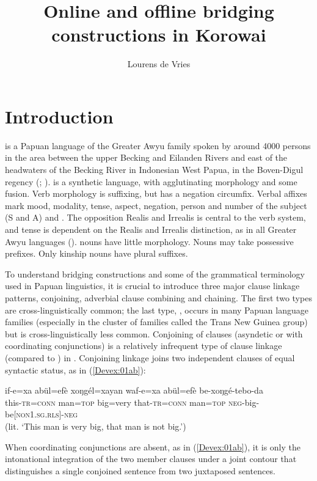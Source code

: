 \documentclass[output=paper]{LSP/langsci}
\author{
   Lourens de Vries\affiliation{Vrije Universiteit Amsterdam} 
   }
\title{Online and offline bridging constructions in Korowai}
\begin{document}
\section{Introduction} 
\label{Devsec:Introduction}
 is a Papuan language of the Greater Awyu family spoken by around 4000 persons in the area between the upper Becking and Eilanden Rivers and east of the headwaters of the Becking River in Indonesian West Papua, in the Boven-Digul regency (\citealt{enk97}; \citealt{devries.2012}).  is a synthetic language, with agglutinating morphology and some fusion. Verb morphology is suffixing, but  has a negation circumfix. Verbal affixes mark mood, modality, tense, aspect, negation, person and number of the subject (S and A) and . The opposition Realis and Irrealis is central to the verb system, and tense is dependent on the Realis and Irrealis distinction, as in all Greater Awyu languages (\citealt{wester14}).  nouns have little morphology. Nouns may take possessive prefixes. Only kinship nouns have plural suffixes.

To understand  bridging constructions and some of the grammatical terminology used in Papuan linguistics, it is crucial to introduce three major  clause linkage patterns, conjoining, adverbial clause combining and chaining. The first two types are cross-linguistically common; the last type, , occurs in many Papuan language families (especially in the cluster of families called the Trans New Guinea group) but is cross-linguistically less common. Conjoining of clauses (asyndetic or with coordinating conjunctions) is a relatively infrequent type of clause linkage (compared to ) in . Conjoining linkage joins two independent clauses of equal syntactic status, as in (\ref{Devex:01ab}):

\begin{exe}
\ex \label{Devex:01ab}
\gll if-e=xa abül=efè xoŋgél=xayan waf-e=xa abül=efè be-xoŋgé-tebo-da\\
this-\textsc{tr=conn} man=\textsc{top}	big=very that-\textsc{tr=conn}	man=\textsc{top} \textsc{neg}-big-be[\textsc{non1.sg.rls}]-\textsc{neg}\\
\glt {}
(lit. `This man is very big, that man is not big.') \citep[][71]{enk97}\\
\end{exe}

\noindent
When coordinating conjunctions are absent, as in (\ref{Devex:01ab}), it is only the intonational integration of the two member clauses under a joint contour that distinguishes a single conjoined sentence from two juxtaposed sentences. 
\end{document}
